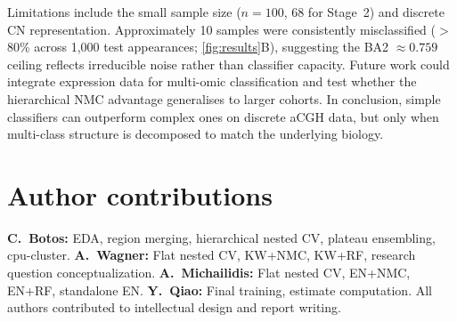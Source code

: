 \documentclass[11pt,a4paper,twocolumn]{article}
\begin{document}
Limitations include the small sample size ($n = 100$, 68 for Stage~2) and discrete CN representation. Approximately 10 samples were consistently misclassified ($>$80\% across 1,000 test appearances; \autoref{fig:results}B), suggesting the BA2 $\approx 0.759$ ceiling reflects irreducible noise rather than classifier capacity. Future work could integrate expression data for multi-omic classification and test whether the hierarchical NMC advantage generalises to larger cohorts. In conclusion, simple classifiers can outperform complex ones on discrete aCGH data, but only when multi-class structure is decomposed to match the underlying biology.

\vspace{-4pt}
\section*{Author contributions}
\vspace{-2pt}

{\small
\textbf{C.~Botos:} EDA, region merging, hierarchical nested CV, plateau ensembling, cpu-cluster.
\textbf{A.~Wagner:} Flat nested CV, KW+NMC, KW+RF, research question conceptualization.
\textbf{A.~Michailidis:} Flat nested CV, EN+NMC, EN+RF, standalone EN.
\textbf{Y.~Qiao:} Final training, estimate computation.
All authors contributed to intellectual design and report writing.
}

\vspace{-3pt}

\end{document}
